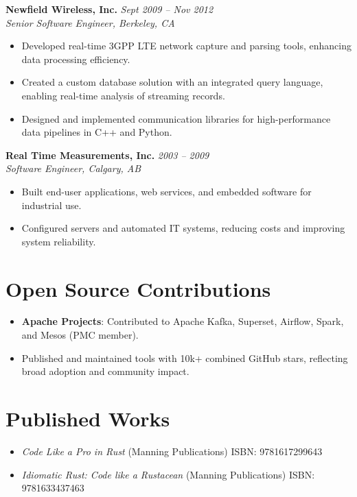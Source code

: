 \documentclass[margin,line]{resume}
\begin{document}
\begin{resume}
\textbf{Newfield Wireless, Inc.} \hfill \textit{Sept 2009 -- Nov 2012} \\
\textit{Senior Software Engineer, Berkeley, CA}
\begin{itemize}[leftmargin=0.5cm]
    \item Developed real-time 3GPP LTE network capture and parsing tools, enhancing data processing efficiency.
    \item Created a custom database solution with an integrated query language, enabling real-time analysis of streaming records.
    \item Designed and implemented communication libraries for high-performance data pipelines in C++ and Python.
\end{itemize}

\textbf{Real Time Measurements, Inc.} \hfill \textit{2003 -- 2009} \\
\textit{Software Engineer, Calgary, AB}
\begin{itemize}[leftmargin=0.5cm]
    \item Built end-user applications, web services, and embedded software for industrial use.
    \item Configured servers and automated IT systems, reducing costs and improving system reliability.
\end{itemize}

\vspace{10pt}

\section{Open Source Contributions}
\begin{itemize}[leftmargin=0.5cm]
\item \textbf{Apache Projects}: Contributed to Apache Kafka, Superset, Airflow, Spark, and Mesos (PMC member).
\item Published and maintained tools with 10k+ combined GitHub stars, reflecting broad adoption and community impact.
\end{itemize}

\vspace{10pt}

\section{Published Works}
\begin{itemize}[leftmargin=0.5cm]
\item \textit{Code Like a Pro in Rust} (Manning Publications) \hfill ISBN: 9781617299643  
\item \textit{Idiomatic Rust: Code like a Rustacean} (Manning Publications) \hfill ISBN: 9781633437463  
\end{itemize}


\end{resume}
\end{document}
